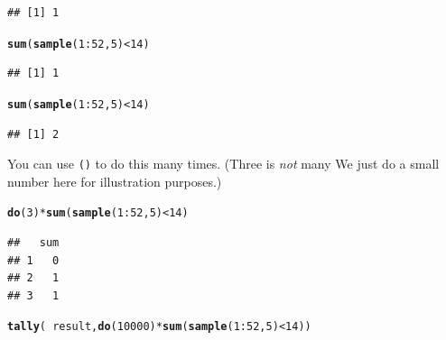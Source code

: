\documentclass[twoside]{book}\usepackage[]{graphicx}\usepackage[]{xcolor}
\makeatletter
\newcommand{\hlnum}[1]{\textcolor[rgb]{0.686,0.059,0.569}{#1}}%
\newcommand{\hlopt}[1]{\textcolor[rgb]{0,0,0}{#1}}%
\newcommand{\hlstd}[1]{\textcolor[rgb]{0.345,0.345,0.345}{#1}}%
\newcommand{\hlkwd}[1]{\textcolor[rgb]{0.737,0.353,0.396}{\textbf{#1}}}%
\newenvironment{kframe}{%
 \def\at@end@of@kframe{}%
 \ifinner\ifhmode%
  \def\at@end@of@kframe{\end{minipage}}%
  \begin{minipage}{\columnwidth}%
 \fi\fi%
 \def\FrameCommand##1{\hskip\@totalleftmargin \hskip-\fboxsep
 \colorbox{shadecolor}{##1}\hskip-\fboxsep
     \hskip-\linewidth \hskip-\@totalleftmargin \hskip\columnwidth}%
 \MakeFramed {\advance\hsize-\width
   \@totalleftmargin\z@ \linewidth\hsize
   \@setminipage}}%
 {\par\unskip\endMakeFramed%
 \at@end@of@kframe}
\newenvironment{knitrout}{}{} %
\newcommand{\Rindex}[1]{\index{\texttt{#1}}}
\newcommand{\function}[1]{{\color{purple!75!blue}\texttt{\StrSubstitute{#1}{()}{}()}}\Rindex{#1}}
\makeatother
\begin{document}
\begin{problem}
\begin{knitrout}
\begin{kframe}
\begin{alltt}
\end{alltt}
\begin{verbatim}
## [1] 1
\end{verbatim}
\begin{alltt}
\hlkwd{sum}\hlstd{(}\hlkwd{sample}\hlstd{(}\hlnum{1}\hlopt{:}\hlnum{52}\hlstd{,} \hlnum{5}\hlstd{)} \hlopt{<} \hlnum{14}\hlstd{)}
\end{alltt}
\begin{verbatim}
## [1] 1
\end{verbatim}
\begin{alltt}
\hlkwd{sum}\hlstd{(}\hlkwd{sample}\hlstd{(}\hlnum{1}\hlopt{:}\hlnum{52}\hlstd{,} \hlnum{5}\hlstd{)} \hlopt{<} \hlnum{14}\hlstd{)}
\end{alltt}
\begin{verbatim}
## [1] 2
\end{verbatim}
\end{kframe}
\end{knitrout}
	You can use \function{do()} to do this many times. (Three is \emph{not} many\! We just do a small number here 
	for illustration purposes.)
\begin{knitrout}
\color{fgcolor}\begin{kframe}
\begin{alltt}
\hlkwd{do}\hlstd{(}\hlnum{3}\hlstd{)} \hlopt{*} \hlkwd{sum}\hlstd{(}\hlkwd{sample}\hlstd{(}\hlnum{1}\hlopt{:}\hlnum{52}\hlstd{,} \hlnum{5}\hlstd{)} \hlopt{<} \hlnum{14}\hlstd{)}
\end{alltt}
\begin{verbatim}
##   sum
## 1   0
## 2   1
## 3   1
\end{verbatim}
\end{kframe}
\end{knitrout}
\end{problem}

\begin{solution}
\begin{knitrout}
\color{fgcolor}\begin{kframe}
\begin{alltt}
\hlkwd{tally}\hlstd{(}\hlopt{~}\hlstd{result,} \hlkwd{do}\hlstd{(}\hlnum{10000}\hlstd{)} \hlopt{*} \hlkwd{sum}\hlstd{(}\hlkwd{sample}\hlstd{(}\hlnum{1}\hlopt{:}\hlnum{52}\hlstd{,} \hlnum{5}\hlstd{)} \hlopt{<} \hlnum{14}\hlstd{))}
\end{alltt}


{\ttfamily\noindent\itshape\color{messagecolor}{\#\# First argument should be a formula... But I'll try to guess what you meant}}

{\ttfamily\noindent\bfseries{}}\end{kframe}
\end{knitrout}
\end{solution}
\end{document}
